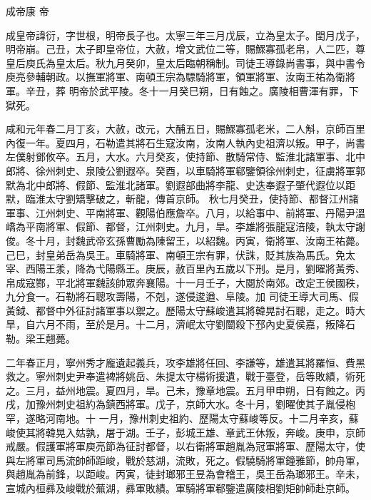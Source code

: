 
\begin{pinyinscope}

 成帝康
 帝



 成皇帝諱衍，字世根，明帝長子也。太寧三年三月戊辰，立為皇太子。閏月戊子，明帝崩。己丑，太子即皇帝位，大赦，增文武位二等，賜鰥寡孤老帛，人二匹，尊皇后庾氏為皇太后。秋九月癸卯，皇太后臨朝稱制。司徒王導錄尚書事，與中書令庾亮參輔朝政。以撫軍將軍、南頓王宗為驃騎將軍，領軍將軍、汝南王祐為衛將軍。辛丑，葬
 明帝於武平陵。冬十一月癸巳朔，日有蝕之。廣陵相曹渾有罪，下獄死。



 咸和元年春二月丁亥，大赦，改元，大酺五日，賜鰥寡孤老米，二人斛，京師百里內復一年。夏四月，石勒遣其將石生寇汝南，汝南人執內史祖濟以叛。甲子，尚書左僕射鄧攸卒。五月，大水。六月癸亥，使持節、散騎常侍、監淮北諸軍事、北中郎將、徐州刺史、泉陵公劉遐卒。癸酉，以車騎將軍郗鑒領徐州刺史，征虜將軍郭默為北中郎將、假節、監淮北諸軍。劉遐部曲將李龍、史迭奉遐子肇代遐位以距默，臨淮太守劉矯擊破之，斬龍，傳首京師。
 秋七月癸丑，使持節、都督江州諸軍事、江州刺史、平南將軍、觀陽伯應詹卒。八月，以給事中、前將軍、丹陽尹溫嶠為平南將軍、假節、都督，江州刺史。九月，旱。李雄將張龍寇涪陵，執太守謝俊。冬十月，封魏武帝玄孫曹勵為陳留王，以紹魏。丙寅，衛將軍、汝南王祐薨。己巳，封皇弟岳為吳王。車騎將軍、南頓王宗有罪，伏誅，貶其族為馬氏。免太宰、西陽王羕，降為弋陽縣王。庚辰，赦百里內五歲以下刑。是月，劉曜將黃秀、帛成寇酂，平北將軍魏該帥眾奔襄陽。十一月壬子，大閱於南郊。改定王侯國秩，九分食一。石勒將石聰攻壽陽，不剋，遂侵逡遒、阜陵。加
 司徒王導大司馬、假黃鉞、都督中外征討諸軍事以禦之。歷陽太守蘇峻遣其將韓晃討石聰，走之。時大旱，自六月不雨，至於是月。十二月，濟岷太守劉闓殺下邳內史夏侯嘉，叛降石勒。梁王翹薨。



 二年春正月，寧州秀才龐遺起義兵，攻李雄將任回、李謙等，雄遣其將羅恒、費黑救之。寧州刺史尹奉遣裨將姚岳、朱提太守楊術援遺，戰于臺登，岳等敗績，術死之。三月，益州地震。夏四月，旱。己未，豫章地震。五月甲申朔，日有蝕之。丙戌，加豫州刺史祖約為鎮西將軍。戊子，京師大水。冬十月，劉曜使其子胤侵枹罕，遂略河南地。十
 一月，豫州刺史祖約、歷陽太守蘇峻等反。十二月辛亥，蘇峻使其將韓晃入姑孰，屠于湖。壬子，彭城王雄、章武王休叛，奔峻。庚申，京師戒嚴。假護軍將軍庾亮節為征討都督，以右衛將軍趙胤為冠軍將軍、歷陽太守，使與左將軍司馬流帥師距峻，戰於慈湖，流敗，死之。假驍騎將軍鐘雅節，帥舟軍，與趙胤為前鋒，以距峻。丙寅，徒封瑯邪王昱為會稽王，吳王岳為瑯邪王。辛未，宣城內桓彞及峻戰於蕪湖，彞軍敗績。軍騎將軍郗鑒遣廣陵相劉矩帥師赴京師。




\end{pinyinscope}
